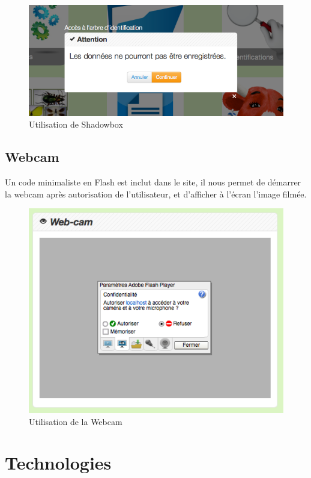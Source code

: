 \documentclass[twoside]{EPURapport}
\begin{document}
		\begin{figure}[hbtp]
			\centering
			\includegraphics[scale=0.5]{images/lib-shadowbox.png}
			\caption{Utilisation de Shadowbox}
		\end{figure}
		
		\subsection{Webcam}
		\label{lib:webcam}
		Un code minimaliste en Flash est inclut dans le site, il nous permet de démarrer la webcam après autorisation de l'utilisateur, et d'afficher à l'écran l'image filmée.
		
		\begin{figure}[hbtp]
			\centering
			\includegraphics[scale=0.5]{images/lib-webcam.png}
			\caption{Utilisation de la Webcam}
		\end{figure}
	
	\section{Technologies}
	\label{tec}
	
\end{document}
